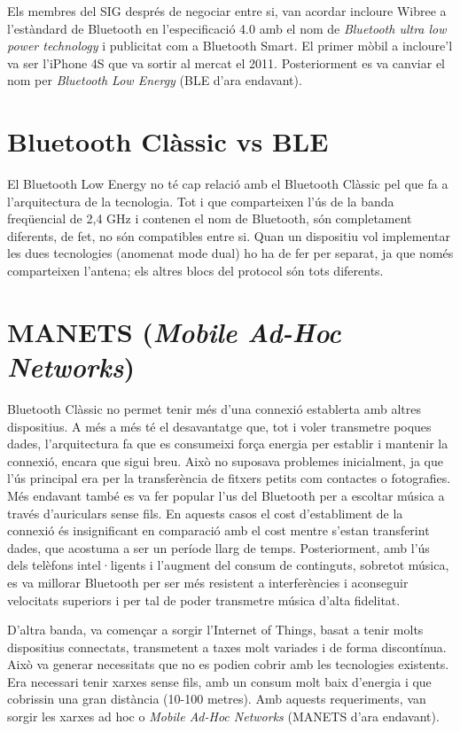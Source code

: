 Els membres del SIG després de negociar entre si, van acordar incloure Wibree a l'estàndard de Bluetooth en l'especificació 4.0 amb el nom de \textit{Bluetooth ultra low power technology} i publicitat com a Bluetooth Smart. El primer mòbil a incloure'l va ser l'iPhone 4S que va sortir al mercat el 2011.
Posteriorment es va canviar el nom per \textit{Bluetooth Low Energy} (BLE d'ara endavant).

\section{Bluetooth Clàssic vs BLE}
El Bluetooth Low Energy no té cap relació amb el Bluetooth Clàssic pel que fa a l'arquitectura de la tecnologia.
Tot i que comparteixen l'ús de la banda freqüencial de 2,4 GHz i contenen el nom de Bluetooth, són completament diferents, de fet, no són compatibles entre si.
Quan un dispositiu vol implementar les dues tecnologies (anomenat mode dual) ho ha de fer per separat, ja que només comparteixen l'antena; els altres blocs del protocol són tots diferents.

\section{MANETS (\textit{Mobile Ad-Hoc Networks})}
Bluetooth Clàssic no permet tenir més d'una connexió establerta amb altres dispositius.
A més a més té el desavantatge que, tot i voler transmetre poques dades, l'arquitectura fa que es consumeixi força energia per establir i mantenir la connexió, encara que sigui breu.
Això no suposava problemes inicialment, ja que l'ús principal era per la transferència de fitxers petits com contactes o fotografies.
Més endavant també es va fer popular l'us del Bluetooth per a escoltar música a través d'auriculars sense fils.
En aquests casos el cost d'establiment de la connexió és insignificant en comparació amb el cost mentre s'estan transferint dades, que acostuma a ser un període llarg de temps.
Posteriorment, amb l'ús dels telèfons intel·ligents i l'augment del consum de continguts, sobretot música, es va millorar Bluetooth per ser més resistent a interferències i aconseguir velocitats superiors i per tal de poder transmetre música d'alta fidelitat.

D'altra banda, va començar a sorgir l'Internet of Things, basat a tenir molts dispositius connectats, transmetent a taxes molt variades i de forma discontínua.
Això va generar necessitats que no es podien cobrir amb les tecnologies existents.
Era necessari tenir xarxes sense fils, amb un consum molt baix d'energia i que cobrissin una gran distància (10-100 metres).
Amb aquests requeriments, van sorgir les xarxes ad hoc o \textit{Mobile Ad-Hoc Networks} (MANETS d'ara endavant).

